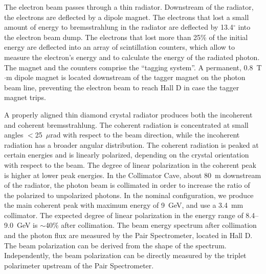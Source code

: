 The electron beam passes through a thin radiator. Downstream of the
radiator, the electrons are deflected by a dipole magnet. The
electrons that lost a small amount of energy to bremsstrahlung in the
radiator are deflected by 13.4$^\circ$ into the electron beam dump.
The electrons that lost more than 25\% of the initial energy are
deflected into an array of scintillation counters, which allow to
measure the electron's energy and to calculate the energy of the
radiated photon. The magnet and the counters comprise the ``tagging
system''. A permanent, 0.8~T$\cdot$m dipole magnet is located
downstream of the tagger magnet on the photon beam line, preventing
the electron beam to reach Hall D in case the tagger magnet trips.

A properly aligned thin diamond crystal radiator produces both the
incoherent and coherent bremsstrahlung. The coherent radiation is
concentrated at small angles $<$25~$\mu$rad with respect to the beam
direction, while the incoherent radiation has a broader angular
distribution.  The coherent radiation is peaked at certain energies
and is linearly polarized, depending on the crystal orientation with
respect to the beam. The degree of linear polarization in the coherent
peak is higher at lower peak energies. In the Collimator Cave, about
80~m downstream of the radiator, the photon beam is collimated in
order to increase the ratio of the polarized to unpolarized photons.  In
the nominal \GX{} configuration, we produce the main coherent peak
with maximum energy of 9~GeV, and use a 3.4~mm collimator.
The expected degree of linear polarization in the energy range of
8.4--9.0~GeV is $\sim$40\% after collimation. The beam energy spectrum
after collimation and the photon flux are measured by the Pair
Spectrometer, located in Hall D. The beam polarization can be derived
from the shape of the spectrum. Independently, the beam polarization
can be directly measured by the triplet polarimeter upstream of the
Pair Spectrometer.
 

